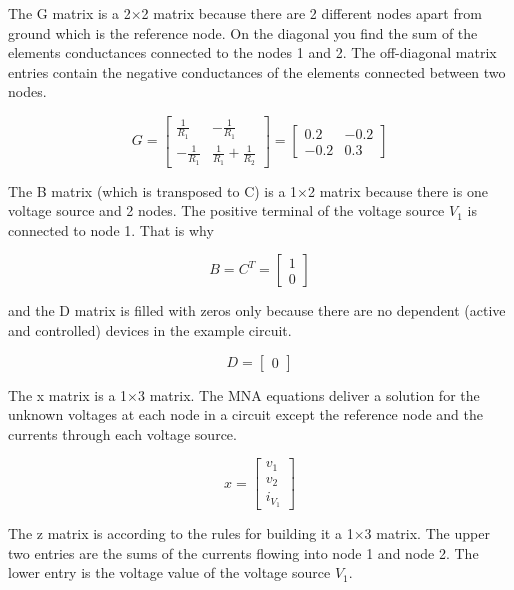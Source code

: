 The G matrix is a 2$\times$2 matrix because there are 2 different
nodes apart from ground which is the reference node.  On the diagonal
you find the sum of the elements conductances connected to the nodes 1
and 2.  The off-diagonal matrix entries contain the negative
conductances of the elements connected between two nodes.

\begin{equation}
G =
\begin{bmatrix}
\frac{1}{R_{1}} & -\frac{1}{R_{1}}\\
-\frac{1}{R_{1}} & \frac{1}{R_{1}} + \frac{1}{R_{2}}
\end{bmatrix}
=
\begin{bmatrix}
0.2 & -0.2\\
-0.2 & 0.3
\end{bmatrix}
\end{equation}

The B matrix (which is transposed to C) is a 1$\times$2 matrix because
there is one voltage source and 2 nodes.  The positive terminal of the
voltage source $V_{1}$ is connected to node 1.  That is why

\begin{equation}
B = C^{T} =
\begin{bmatrix}
1\\
0
\end{bmatrix}
\end{equation}

and the D matrix is filled with zeros only because there are no dependent
(active and controlled) devices in the example circuit.

\begin{equation}
D =
\begin{bmatrix}
0
\end{bmatrix}
\end{equation}

The x matrix is a 1$\times$3 matrix.  The MNA equations deliver a
solution for the unknown voltages at each node in a circuit except the
reference node and the currents through each voltage source.

\begin{equation}
x =
\begin{bmatrix}
v_{1}\\
v_{2}\\
i_{V_{1}}
\end{bmatrix}
\end{equation}

The z matrix is according to the rules for building it a 1$\times$3
matrix.  The upper two entries are the sums of the currents flowing
into node 1 and node 2.  The lower entry is the voltage value of the
voltage source $V_{1}$.

